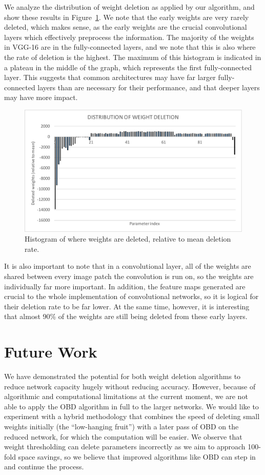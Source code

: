 \documentclass[10pt,twocolumn,letterpaper]{article}
\begin{document}
We analyze the distribution of weight deletion as applied by our algorithm, and show these results in Figure~\ref{fig:vgg-histo}.
We note that the early weights are very rarely deleted, which makes sense, as the early weights are the crucial convolutional layers which effectively preprocess the information.
The majority of the weights in VGG-16 are in the fully-connected layers, and we note that this is also where the rate of deletion is the highest.
The maximum of this histogram is indicated in a plateau in the middle of the graph, which represents the first fully-connected layer.
This suggests that common architectures may have far larger fully-connected layers than are necessary for their performance, and that deeper layers may have more impact.

\begin{figure}[h]
  \centering
  \includegraphics[width=\linewidth]{cifar-histogram.pdf}
  \caption{Histogram of where weights are deleted, relative to mean deletion rate.}
  \label{fig:vgg-histo}
\end{figure}

It is also important to note that in a convolutional layer, all of the weights are shared between every image patch the convolution is run on, so the weights are individually far more important.
In addition, the feature maps generated are crucial to the whole implementation of convolutional networks, so it is logical for their deletion rate to be far lower.
At the same time, however, it is interesting that almost 90\% of the weights are still being deleted from these early layers.

\section{Future Work}
We have demonstrated the potential for both weight deletion algorithms to reduce network capacity hugely without reducing accuracy.
However, because of algorithmic and computational limitations at the current moment, we are not able to apply the OBD algorithm in full to the larger networks.
We would like to experiment with a hybrid methodology that combines the speed of deleting small weights initially (the ``low-hanging fruit'') with a later pass of OBD on the reduced network, for which the computation will be easier.
We observe that weight thresholding can delete parameters incorrectly as we aim to approach 100-fold space savings, so we believe that improved algorithms like OBD can step in and continue the process.
\end{document}
